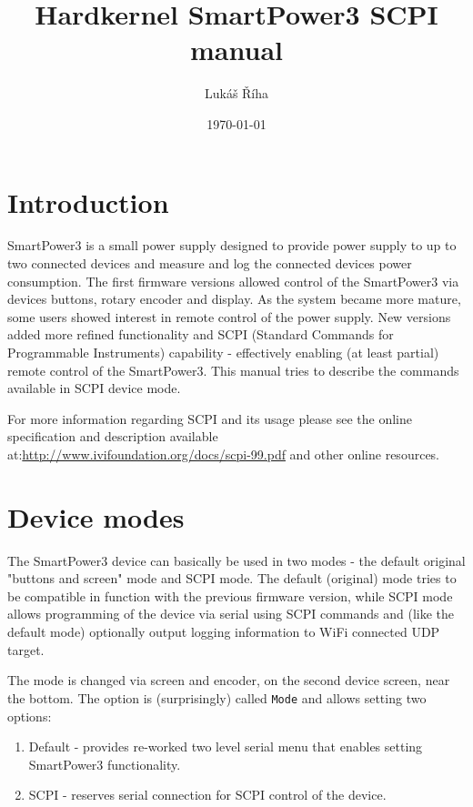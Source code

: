 \documentclass[a4paper,10pt]{article}
\title{Hardkernel SmartPower3 SCPI manual}
\author{Lukáš Říha}
\date{\today}
\begin{document}
\renewcommand{\labelenumii}{\arabic{enumi}.\arabic{enumii}}
\renewcommand{\labelenumiii}{\arabic{enumi}.\arabic{enumii}.\arabic{enumiii}}
\renewcommand{\labelenumiv}{\arabic{enumi}.\arabic{enumii}.\arabic{enumiii}.\arabic{enumiv}}

\maketitle
\tableofcontents


\section{Introduction}

SmartPower3 is a small power supply designed to provide power supply to up to two connected devices and measure and log the connected devices power consumption. The first firmware versions allowed control of the SmartPower3 via devices buttons, rotary encoder and display. As the system became more mature, some users showed interest in remote control of the power supply. New versions added more refined functionality and SCPI (Standard Commands for Programmable Instruments) capability - effectively enabling (at least partial) remote control of the SmartPower3. This manual tries to describe the commands available in SCPI device mode. 

For more information regarding SCPI and its usage please see the online specification and description available at:\newline\href{http://www.ivifoundation.org/docs/scpi-99.pdf}{http://www.ivifoundation.org/docs/scpi-99.pdf}\newline
and other online resources.

\section{Device modes}

The SmartPower3 device can basically be used in two modes - the default original "buttons and screen" mode and SCPI mode. The default (original) mode tries to be compatible in function with the previous firmware version, while SCPI mode allows programming of the device via serial using SCPI commands and (like the default mode) optionally output logging information to WiFi connected UDP target.

The mode is changed via screen and encoder, on the second device screen, near the bottom. The option is (surprisingly) called \verb|Mode| and allows setting two options:
\begin{enumerate}
    \item Default - provides re-worked two level serial menu that enables setting SmartPower3 functionality.
    \item SCPI - reserves serial connection for SCPI control of the device.
\end{enumerate}
\end{document}
